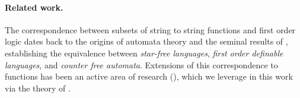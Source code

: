 \paragraph{Related work.} The correspondence between subsets of string to
string functions and first order logic dates back to the origins of automata
theory and the seminal results of \cite{PEPI86,SCHU65,MNPA71}, establishing the
equivalence between \emph{star-free languages}, \emph{first order definable
languages}, and \emph{counter free automata}. Extensions of this correspondence
to functions has been an active area of research (\cite{CADA15,MUSC19}), which
we leverage in this work via the theory of 
\cite{ENMA02,bojanczyk2018polyregular,bojanczyk2019string,bojanczyk2023growth}.

